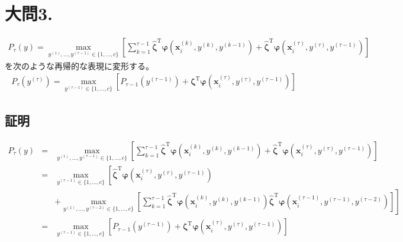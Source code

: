 \documentclass[fleqn]{jsarticle}
\begin{document}
\section*{大問3.}
\begin{eqnarray*}
  P_\tau(y) = \max_{y^{(1)},..., y^{(\tau-1)} \in \{1,...,c\}} \left[
    \sum^{\tau-1}_{k=1} \hat{\mathbf \zeta}^{\mathrm T} {\mathbf \varphi}({\mathbf x}^{(k)}_i, y^{(k)}, y^{(k-1)})
      + \hat{\mathbf \zeta}^{\mathrm T} {\mathbf \varphi} ({\mathbf x}^{(\tau)}_i, y^{(\tau)}, y^{(\tau-1)})
    \right]
\end{eqnarray*}
を次のような再帰的な表現に変形する。
\begin{eqnarray*}
  P_\tau(y^{(\tau)}) = \max_{y^{(\tau-1)} \in \{1,...,c\}} \left[
    P_{\tau-1}(y^{(\tau-1)}) +
    {\mathbf \zeta}^{\mathrm T} {\mathbf \varphi} ({\mathbf x}^{(\tau)}_i, y^{(\tau)}, y^{(\tau-1)})
  \right]
\end{eqnarray*}


\subsection*{証明}
\begin{eqnarray*}
  P_\tau(y) &=& \max_{y^{(1)},..., y^{(\tau-1)} \in \{1,...,c\}} \left[
    \sum^{\tau-1}_{k=1} \hat{\mathbf \zeta}^{\mathrm T} {\mathbf \varphi}({\mathbf x}^{(k)}_i, y^{(k)}, y^{(k-1)})
    + \hat{\mathbf \zeta}^{\mathrm T} {\mathbf \varphi} ({\mathbf x}^{(\tau)}_i, y^{(\tau)}, y^{(\tau-1)}) \right]\\
  &=& \max_{y^{(\tau-1)} \in \{1,...,c\}} \left[
    \hat{\mathbf \zeta}^{\mathrm T} {\mathbf \varphi} ({\mathbf x}^{(\tau)}_i, y^{(\tau)}, y^{(\tau-1)}) \right.\\
      && \left. + \max_{y^{(1)},..., y^{(\tau-2)} \in \{1,...,c\}} \left[
      \sum^{\tau-1}_{k=1} \hat{\mathbf \zeta}^{\mathrm T} {\mathbf \varphi}({\mathbf x}^{(k)}_i, y^{(k)}, y^{(k-1)})
      \hat{\mathbf \zeta}^{\mathrm T} {\mathbf \varphi} ({\mathbf x}^{(\tau-1)}_i, y^{(\tau-1)}, y^{(\tau-2)})
      \right] \right]\\
  &=& \max_{y^{(\tau-1)} \in \{1,...,c\}} \left[
    P_{\tau-1}(y^{(\tau-1)}) +
    {\mathbf \zeta}^{\mathrm T} {\mathbf \varphi} ({\mathbf x}^{(\tau)}_i, y^{(\tau)}, y^{(\tau-1)})
    \right]
\end{eqnarray*}









\newpage
\end{document}
